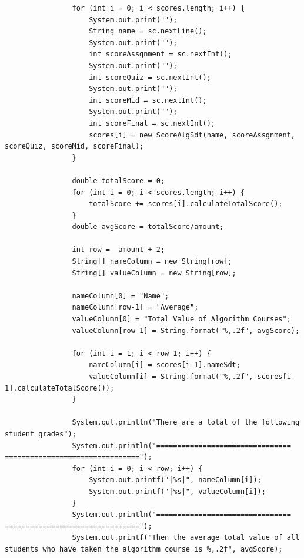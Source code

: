 \documentclass[12pt,titlepage]{article}
\begin{document}
\begin{enumerate}
\begin{verbatim}
                for (int i = 0; i < scores.length; i++) {
                    System.out.print("");
                    String name = sc.nextLine();
                    System.out.print("");
                    int scoreAssgnment = sc.nextInt();
                    System.out.print("");
                    int scoreQuiz = sc.nextInt();
                    System.out.print("");
                    int scoreMid = sc.nextInt();
                    System.out.print("");
                    int scoreFinal = sc.nextInt();
                    scores[i] = new ScoreAlgSdt(name, scoreAssgnment, scoreQuiz, scoreMid, scoreFinal);
                }
                
                double totalScore = 0; 
                for (int i = 0; i < scores.length; i++) {
                    totalScore += scores[i].calculateTotalScore();
                }
                double avgScore = totalScore/amount;

                int row =  amount + 2;
                String[] nameColumn = new String[row];
                String[] valueColumn = new String[row];

                nameColumn[0] = "Name";
                nameColumn[row-1] = "Average";
                valueColumn[0] = "Total Value of Algorithm Courses";
                valueColumn[row-1] = String.format("%,.2f", avgScore);

                for (int i = 1; i < row-1; i++) {
                    nameColumn[i] = scores[i-1].nameSdt;
                    valueColumn[i] = String.format("%,.2f", scores[i-1].calculateTotalScore());
                }

                System.out.println("There are a total of the following student grades");
                System.out.println("================================ ================================");
                for (int i = 0; i < row; i++) {
                    System.out.printf("|%s|", nameColumn[i]);
                    System.out.printf("|%s|", valueColumn[i]);
                }
                System.out.println("================================ ================================");
                System.out.printf("Then the average total value of all students who have taken the algorithm course is %,.2f", avgScore);


\end{verbatim}
\end{enumerate}
\end{document}
